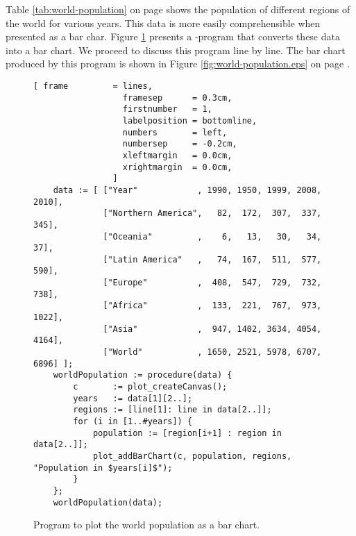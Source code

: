 \noindent
Table \ref{tab:world-population} on page \pageref{tab:world-population} shows the population of
different regions of the world for various years.  This data is more easily comprehensible when
presented as a bar char.  Figure \ref{fig:world-population.stlx} presents a \setlx-program that
converts these data into a bar chart.  We proceed to discuss this program line by line.
The bar chart produced by this program is shown in Figure \ref{fig:world-population.eps} on page
\pageref{fig:world-population.eps}.



\begin{figure}[!ht]
\centering
\begin{Verbatim}[ frame         = lines, 
                  framesep      = 0.3cm, 
                  firstnumber   = 1,
                  labelposition = bottomline,
                  numbers       = left,
                  numbersep     = -0.2cm,
                  xleftmargin   = 0.0cm,
                  xrightmargin  = 0.0cm,
                ]
    data := [ ["Year"            , 1990, 1950, 1999, 2008, 2010],
              ["Northern America",   82,  172,  307,  337,  345],
              ["Oceania"         ,    6,   13,   30,   34,   37],
              ["Latin America"   ,   74,  167,  511,  577,  590],
              ["Europe"          ,  408,  547,  729,  732,  738], 
              ["Africa"          ,  133,  221,  767,  973, 1022], 
              ["Asia"            ,  947, 1402, 3634, 4054, 4164],
              ["World"           , 1650, 2521, 5978, 6707, 6896] ];
    worldPopulation := procedure(data) {
        c       := plot_createCanvas();
        years   := data[1][2..];
        regions := [line[1]: line in data[2..]];
        for (i in [1..#years]) {
            population := [region[i+1] : region in data[2..]];
            plot_addBarChart(c, population, regions, "Population in $years[i]$");
        }
    };
    worldPopulation(data);
\end{Verbatim}
\vspace*{-0.3cm}
\caption{Program to plot the world population as a bar chart.}
\label{fig:world-population.stlx}
\end{figure}


